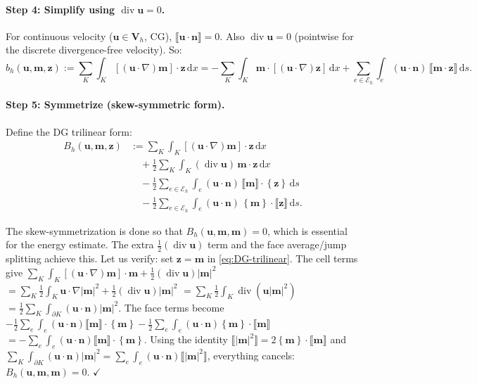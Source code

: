 \documentclass[11pt,a4paper]{article}
\theoremstyle{definition}
\theoremstyle{remark}
\newcommand{\dd}{\,\mathrm{d}}
\newcommand{\dv}{\operatorname{div}}
\newcommand{\grad}{\nabla}
\newcommand{\half}{\tfrac{1}{2}}
\newcommand{\jump}[1]{\llbracket #1 \rrbracket}
\newcommand{\avg}[1]{\left\{ #1 \right\}}
\newcommand{\bfu}{\bm{u}}
\newcommand{\bfm}{\bm{m}}
\newcommand{\bfn}{\bm{n}}
\newcommand{\bfz}{\bm{z}}
\newcommand{\Eh}{\mathcal{E}_h}
\newcommand{\bfV}{\bm{V}}
\begin{document}
\paragraph{Step 4: Simplify using $\dv\bfu = 0$.}
For continuous velocity ($\bfu \in \bfV{}_h$, CG), $\jump{\bfu\cdot\bfn} = 0$.
Also $\dv\bfu = 0$ (pointwise for the discrete divergence-free velocity).
So:
\[
  b_h(\bfu, \bfm, \bfz) := \sum_K \int_K [(\bfu\cdot\grad)\bfm]\cdot\bfz \dd x
  = -\sum_K \int_K \bfm\cdot[(\bfu\cdot\grad)\bfz] \dd x
    + \sum_{e \in \Eh} \int_e (\bfu\cdot\bfn)\,\jump{\bfm\cdot\bfz} \dd s.
\]

\paragraph{Step 5: Symmetrize (skew-symmetric form).}
Define the DG trilinear form:
\begin{equation}
  \label{eq:DG-trilinear}
  \boxed{
  \begin{aligned}
    B_h(\bfu, \bfm, \bfz) &:=
    \sum_K \int_K [(\bfu\cdot\grad)\bfm]\cdot\bfz \dd x \\
    &\quad + \half \sum_K \int_K (\dv\bfu)\,\bfm\cdot\bfz \dd x \\
    &\quad - \half \sum_{e \in \Eh} \int_e
      (\bfu\cdot\bfn)\,\jump{\bfm}\cdot\avg{\bfz} \dd s \\
    &\quad - \half \sum_{e \in \Eh} \int_e
      (\bfu\cdot\bfn)\,\avg{\bfm}\cdot\jump{\bfz} \dd s.
  \end{aligned}
  }
\end{equation}

\begin{derivnote}
The skew-symmetrization is done so that
$B_h(\bfu, \bfm, \bfm) = 0$,
which is essential for the energy estimate. The extra $\half(\dv\bfu)$
term and the face average/jump splitting achieve this.
Let us verify: set $\bfz = \bfm$ in \eqref{eq:DG-trilinear}. The cell
terms give
$\sum_K \int_K [(\bfu\cdot\grad)\bfm]\cdot\bfm + \half(\dv\bfu)|\bfm|^2$
$= \sum_K \half\int_K \bfu\cdot\grad|\bfm|^2 + \half(\dv\bfu)|\bfm|^2$
$= \sum_K \half\int_K \dv(\bfu|\bfm|^2)$
$= \half\sum_K \int_{\partial K} (\bfu\cdot\bfn)|\bfm|^2$.
The face terms become
$-\half\sum_e \int_e (\bfu\cdot\bfn)\jump{\bfm}\cdot\avg{\bfm}
 -\half\sum_e \int_e (\bfu\cdot\bfn)\avg{\bfm}\cdot\jump{\bfm}$
$= -\sum_e \int_e (\bfu\cdot\bfn)\jump{\bfm}\cdot\avg{\bfm}$.
Using the identity $\jump{|\bfm|^2} = 2\avg{\bfm}\cdot\jump{\bfm}$
and $\sum_K \int_{\partial K}(\bfu\cdot\bfn)|\bfm|^2
= \sum_e \int_e (\bfu\cdot\bfn)\jump{|\bfm|^2}$,
everything cancels: $B_h(\bfu,\bfm,\bfm) = 0$. $\checkmark$
\end{derivnote}
\end{document}
